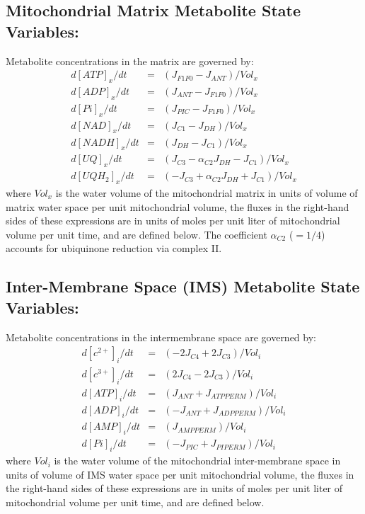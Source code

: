\documentclass[fleqn,10pt]{physiome}
\begin{document}
\subsection{Mitochondrial Matrix Metabolite State Variables:}

Metabolite concentrations in the matrix are governed by:
\begin{eqnarray}\label{eq:2}
  d[ATP]_x/dt  &=& \left(J_{F1F0} - J_{ANT} \right) / Vol_x \nonumber \\	
  d[ADP]_x/dt  &=& \left(J_{ANT} - J_{F1F0} \right) / Vol_x \nonumber\\
  d[Pi]_x/dt   &=& \left(J_{PIC} - J_{F1F0} \right) / Vol_x  \nonumber\\	
  d[NAD]_x/dt  &=& \left(J_{C1} - J_{DH} \right) / Vol_x \nonumber\\
  d[NADH]_x/dt &=& \left(J_{DH} - J_{C1} \right) / Vol_x \nonumber\\
  d[UQ]_x/dt   &=& \left(J_{C3} - \alpha_{C2} J_{DH} - J_{C1} \right) / Vol_x  \nonumber\\	
  d[UQH_2]_x/dt &=&  \left(-J_{C3} + \alpha_{C2} J_{DH} + J_{C1} \right) / Vol_x
\end{eqnarray}
where $Vol_x$ is the water volume of the mitochondrial matrix in units of volume of matrix water space per unit mitochondrial volume, the fluxes in the right-hand sides of these expressions are in units of moles per unit liter of mitochondrial volume per unit time, and are defined below. The coefficient $\alpha_{C2}$ ($=1/4$) accounts for ubiquinone reduction via complex II. 

\subsection{Inter-Membrane Space (IMS) Metabolite State Variables:}

Metabolite concentrations in the intermembrane space are governed by:
\begin{eqnarray}\label{eq:3}
  d[c^{2+} ]_i/dt &=& \left(-2J_{C4} + 2J_{C3} \right) / Vol_i \nonumber\\	
  d[c^{3+} ]_i/dt &=& \left(2J_{C4} - 2J_{C3} \right) / Vol_i \nonumber\\	
  d[ATP]_i/dt     &=& \left(J_{ANT} + J_{ATPPERM} \right) / Vol_i \nonumber\\	
  d[ADP]_i/dt     &=& \left(-J_{ANT} + J_{ADPPERM} \right) / Vol_i \nonumber\\	
  d[AMP]_i/dt     &=& \left(J_{AMPPERM} \right) / Vol_i \nonumber\\	
  d[Pi]_i/dt      &=& \left(-J_{PIC} + J_{PIPERM} \right) / Vol_i 
\end{eqnarray}
where $Vol_i$ is the water volume of the mitochondrial inter-membrane space in units of volume of IMS water space per unit mitochondrial volume, the fluxes in the right-hand sides of these expressions are in units of moles per unit liter of mitochondrial volume per unit time, and are defined below.
\end{document}
